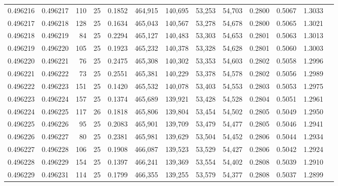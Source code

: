 \begin{tabular}{rrrrrrrrrrrrr}
0.496216 & 0.496217 &   110 &  25 &                                     0.1852 & 464,915 & 140,695 &  53,253 &  54,703 & 0.2800 & 0.5067 & 1.3033 \\
0.496217 & 0.496218 &   128 &  25 &                                     0.1634 & 465,043 & 140,567 &  53,278 &  54,678 & 0.2800 & 0.5065 & 1.3021 \\
0.496218 & 0.496219 &    84 &  25 &                                     0.2294 & 465,127 & 140,483 &  53,303 &  54,653 & 0.2801 & 0.5063 & 1.3013 \\
0.496219 & 0.496220 &   105 &  25 &                                     0.1923 & 465,232 & 140,378 &  53,328 &  54,628 & 0.2801 & 0.5060 & 1.3003 \\
0.496220 & 0.496221 &    76 &  25 &                                     0.2475 & 465,308 & 140,302 &  53,353 &  54,603 & 0.2802 & 0.5058 & 1.2996 \\
0.496221 & 0.496222 &    73 &  25 &                                     0.2551 & 465,381 & 140,229 &  53,378 &  54,578 & 0.2802 & 0.5056 & 1.2989 \\
0.496222 & 0.496223 &   151 &  25 &                                     0.1420 & 465,532 & 140,078 &  53,403 &  54,553 & 0.2803 & 0.5053 & 1.2975 \\
0.496223 & 0.496224 &   157 &  25 &                                     0.1374 & 465,689 & 139,921 &  53,428 &  54,528 & 0.2804 & 0.5051 & 1.2961 \\
0.496224 & 0.496225 &   117 &  26 &                                     0.1818 & 465,806 & 139,804 &  53,454 &  54,502 & 0.2805 & 0.5049 & 1.2950 \\
0.496225 & 0.496226 &    95 &  25 &                                     0.2083 & 465,901 & 139,709 &  53,479 &  54,477 & 0.2805 & 0.5046 & 1.2941 \\
0.496226 & 0.496227 &    80 &  25 &                                     0.2381 & 465,981 & 139,629 &  53,504 &  54,452 & 0.2806 & 0.5044 & 1.2934 \\
0.496227 & 0.496228 &   106 &  25 &                                     0.1908 & 466,087 & 139,523 &  53,529 &  54,427 & 0.2806 & 0.5042 & 1.2924 \\
0.496228 & 0.496229 &   154 &  25 &                                     0.1397 & 466,241 & 139,369 &  53,554 &  54,402 & 0.2808 & 0.5039 & 1.2910 \\
0.496229 & 0.496231 &   114 &  25 &                                     0.1799 & 466,355 & 139,255 &  53,579 &  54,377 & 0.2808 & 0.5037 & 1.2899 \\

\end{tabular}
